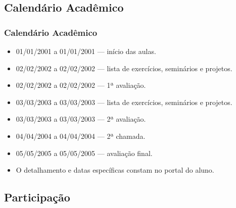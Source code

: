 \subsection[Calendário Acadêmico]{Calendário Acadêmico}\label{subsec:planejamento-calendario}



\begin{frame}[t]\frametitle{Calendário Acadêmico}

  \begin{itemize}
    \justifying{}
    \setlength\itemsep{1em}
    \item 01/01/2001 a 01/01/2001 --- início das aulas.
    \item 02/02/2002 a 02/02/2002 --- lista de exercícios, seminários e projetos.
    \item 02/02/2002 a 02/02/2002 --- 1ª avaliação.
    \item 03/03/2003 a 03/03/2003 --- lista de exercícios, seminários e projetos.
    \item 03/03/2003 a 03/03/2003 --- 2ª avaliação.
    \item 04/04/2004 a 04/04/2004 --- 2ª chamada.
    \item 05/05/2005 a 05/05/2005 --- avaliação final.
    \item O detalhamento e datas específicas constam no portal do aluno.
  \end{itemize}

\end{frame}



\subsection[Participação]{Participação}\label{subsec:planejamento-participacao}



